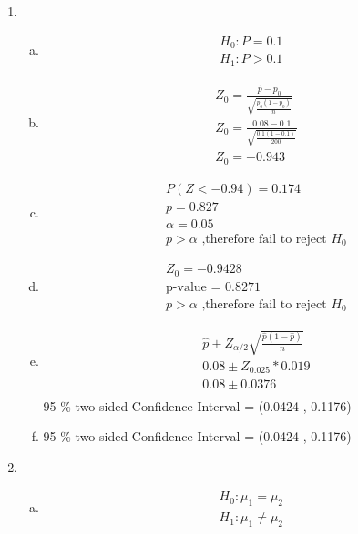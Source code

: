 \documentclass[14pt]{article}
\begin{document}
\begin{enumerate}
\begin{enumerate}[(a)]
\end{enumerate}

\item
\begin{enumerate}[(a)]
\item
\begin{align*}
H_0: P = 0.1 \\[15pt]
H_1: P > 0.1
\end{align*}

\item
\begin{align*}
& Z_0 = \frac{\hat{p} - p_0}{\sqrt{\frac{p_0 (1 - p_0)}{n}}} \\[15pt]
& Z_0 = \frac{0.08 - 0.1}{\sqrt{\frac{0.1 (1 - 0.1)}{200}}} \\[15pt]
& Z_0 = -0.943
\end{align*}

\item
\begin{align*}
& P(Z < -0.94) = 0.174 \\[15pt]
& p = 0.827 \\[15pt]
& \alpha = 0.05 \\[15pt]
& p > \alpha \text{ ,therefore fail to reject } H_0
\end{align*}

\item
\begin{align*}
& Z_0 = -0.9428 \\[15pt]
& \text{p-value = } 0.8271\\[15pt]
& p > \alpha \text{ ,therefore fail to reject } H_0
\end{align*}

\item
\begin{align*}
& \hat{p} \pm Z_{\alpha / 2} \sqrt{\frac{\hat{p}(1-\hat{p})}{n}} \\[15pt]
& 0.08 \pm Z_{0.025} * 0.019 \\[15pt]
& 0.08 \pm 0.0376 \\[15pt]
\end{align*}
95 \% two sided Confidence Interval = (0.0424 , 0.1176)

\item
95 \% two sided Confidence Interval = (0.0424 , 0.1176)

\end{enumerate}

\item
\begin{enumerate}[(a)]
\item
\begin{align*}
H_0: \mu_1 = \mu_2 \\[15pt]
H_1: \mu_1 \neq \mu_2
\end{align*}


\end{enumerate}
\end{enumerate}
\end{document}
